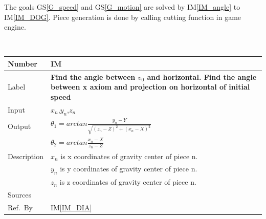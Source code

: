 \documentclass[12pt]{article}
\newcommand{\colAwidth}{0.13\textwidth}
\newcommand{\colBwidth}{0.82\textwidth}
\newcommand{\gsref}[1]{GS\ref{#1}}
\newcounter{instnum} %
\newcommand{\iref}[1]{IM\ref{#1}}
\begin{document}
	The goals \gsref{G_speed} and \gsref{G_motion} are solved by \iref{IM_angle} to \iref{IM_DOG}.
	Piece generation is done by calling cutting function in game engine.   
	
	~\newline
	
	
	\noindent
	\begin{minipage}{\textwidth}
		\renewcommand*{\arraystretch}{1.5}
		\begin{tabular}{| p{\colAwidth} | p{\colBwidth}|}
			\hline
			\rowcolor[gray]{0.9}
			Number& IM{instnum}\theinstnum \label{IM_angle}\\
			\hline
			Label& \bf Find the angle between $v_{0}$ and horizontal. Find the angle between x axiom and projection on horizontal of initial speed \\
			\hline
			Input&$x_{n}$,$y_{n}$,$z_{n}$\\
			\hline
			Output&$\theta_{1}=arctan \frac{y_{n} - Y}{\sqrt{(z_{n}-Z)^2+(x_{n}-X)^2}}$\\
			&$\theta_{2}=arctan \frac{x_{n}-X}{z_{n}-Z}$\\
			\hline
			Description&$x_{n}$ is x coordinates of gravity center of piece n.\\
			&$y_{n}$ is y coordinates of gravity center of piece n.\\
			&$z_{n}$ is z coordinates of gravity center of piece n.\\
			\hline
			Sources&~\ \ \\
			\hline
			Ref.\ By & \iref{IM_DIA}\\
			\hline
		\end{tabular}
	\end{minipage}\\
	
	~\newline
	
\end{document}

